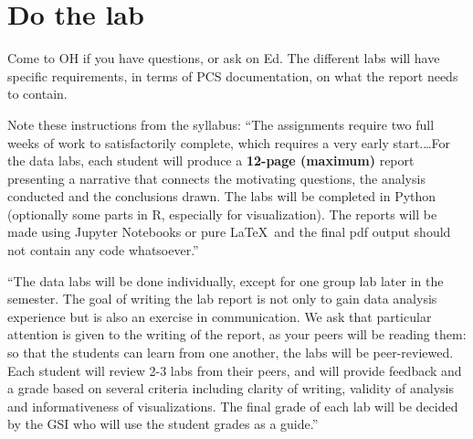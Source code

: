 \documentclass[letterpaper,12pt]{article}
\begin{document}
\section{Do the lab}
Come to OH if you have questions, or ask on Ed. The different labs will have specific requirements, in terms of PCS documentation, on what the report needs to contain.

Note these instructions from the syllabus:
``The assignments require two full weeks of work to satisfactorily complete, which requires a very early start.\ldots For the data labs, each student will produce a \textbf{12-page (maximum)} report presenting a narrative that connects the motivating
questions, the analysis conducted and the conclusions drawn. The labs will be completed in Python
(optionally some parts in R, especially for visualization). The reports will be made using Jupyter
Notebooks or pure \LaTeX\ and the final pdf output should not contain any code whatsoever.''

``The data labs will be done individually, except for one
group lab later in the semester. The goal of writing the lab report is not only to gain data analysis
experience but is also an exercise in communication. We ask that particular attention is given to
the writing of the report, as your peers will be reading them: so that the students can learn from
one another, the labs will be peer-reviewed. Each student will review 2-3 labs from their peers, and
will provide feedback and a grade based on several criteria including clarity of writing, validity of
analysis and informativeness of visualizations. The final grade of each lab will be decided by the
GSI who will use the student grades as a guide.''
\end{document}
